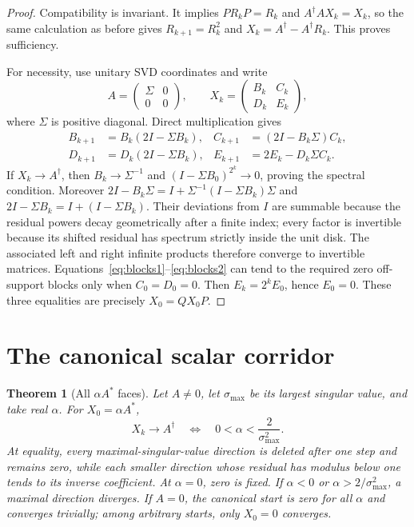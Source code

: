 \documentclass[9pt]{extarticle}
\newtheorem{theorem}{Theorem}
\begin{document}
\begin{proof}
Compatibility is invariant.  It implies $PR_kP=R_k$ and
$A^\dagger AX_k=X_k$, so the same calculation as before gives
$R_{k+1}=R_k^2$ and $X_k=A^\dagger-A^\dagger R_k$.  This proves
sufficiency.

For necessity, use unitary SVD coordinates and write
\[
 A=\begin{pmatrix}\Sigma&0\\0&0\end{pmatrix},\qquad
 X_k=\begin{pmatrix}B_k&C_k\\D_k&E_k\end{pmatrix},
\]
where $\Sigma$ is positive diagonal.  Direct multiplication gives
\begin{align}
 B_{k+1}&=B_k(2I-\Sigma B_k),
 &C_{k+1}&=(2I-B_k\Sigma)C_k,\label{eq:blocks1}\\
 D_{k+1}&=D_k(2I-\Sigma B_k),
 &E_{k+1}&=2E_k-D_k\Sigma C_k.\label{eq:blocks2}
\end{align}
If $X_k\to A^\dagger$, then $B_k\to\Sigma^{-1}$ and
$(I-\Sigma B_0)^{2^k}\to0$, proving the spectral condition.  Moreover
$2I-B_k\Sigma=I+\Sigma^{-1}(I-\Sigma B_k)\Sigma$ and
$2I-\Sigma B_k=I+(I-\Sigma B_k)$.  Their deviations from $I$ are
summable because the residual powers decay geometrically after a finite
index; every factor is invertible because its shifted residual has
spectrum strictly inside the unit disk.  The associated left and right
infinite products therefore converge to invertible matrices.
Equations~\eqref{eq:blocks1}--\eqref{eq:blocks2} can tend to the required
zero off-support blocks only when $C_0=D_0=0$.  Then
$E_k=2^kE_0$, hence $E_0=0$.  These three equalities are precisely
$X_0=QX_0P$.
\end{proof}

\section{The canonical scalar corridor}
\begin{theorem}[All $\alpha A^*$ faces]\label{thm:alpha}
Let $A\neq0$, let $\sigma_{\max}$ be its largest singular value, and
take real $\alpha$.  For $X_0=\alpha A^*$,
\[
 X_k\longrightarrow A^\dagger
 \quad\Longleftrightarrow\quad
 0<\alpha<\frac{2}{\sigma_{\max}^2}.
\]
At equality, every maximal-singular-value direction is deleted after one
step and remains zero, while each smaller direction whose residual has
modulus below one tends to its inverse coefficient.  At $\alpha=0$, zero
is fixed.  If $\alpha<0$ or $\alpha>2/\sigma_{\max}^2$, a maximal
direction diverges.  If $A=0$, the canonical start is zero for all
$\alpha$ and converges trivially; among arbitrary starts, only $X_0=0$
converges.
\end{theorem}
\end{document}
